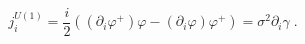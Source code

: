 \begin{equation}
j_{i}^{U(1)}=\frac{i}{2}\left( \left( \partial _{i}\varphi ^{+}\right)
\varphi -\left( \partial _{i}\varphi \right) \varphi ^{+}\right) =\sigma
^{2}\partial _{i}\gamma \;\mathrm{.}  \label{ch}
\end{equation}

